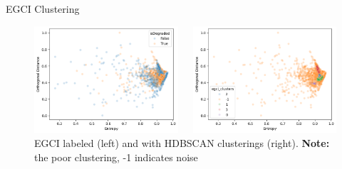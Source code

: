 \begin{frame}{EGCI Clustering}
    \centering
    \begin{figure}
        \begin{columns}
            \begin{column}{0.5\textwidth}
                \includegraphics[height=\textheight,width=\textwidth,keepaspectratio]{images/egci_clustering_labeled.png}
            \end{column}
            \begin{column}{0.5\textwidth}
                \includegraphics[height=\textheight,width=\textwidth,keepaspectratio]{images/egci_clustering.png}
            \end{column}
        \end{columns}
        \caption{EGCI labeled (left) and with HDBSCAN clusterings (right). \textbf{Note:} the poor clustering, -1 indicates noise
        }
    \end{figure}
\end{frame}

